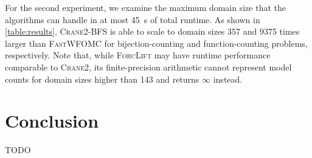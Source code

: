 \documentclass{article}
\theoremstyle{remark}
\newcommand{\Cranetwo}{\textsc{Crane2}}
\newcommand{\Cranebfs}{\textsc{Crane2-BFS}}
\begin{document}
For the second experiment, we examine the maximum domain size that the
algorithms can handle in at most \SI{45}{\second} of total runtime. As shown in
\cref{table:results}, \Cranebfs{} is able to scale to domain sizes \num{357} and
\num{9375} times larger than \textsc{FastWFOMC} for bijection-counting and
function-counting problems, respectively. Note that, while \textsc{ForcLift} may
have runtime performance comparable to \Cranetwo{}, its finite-precision
arithmetic cannot represent model counts for domain sizes higher than 143 and
returns $\infty$ instead.

\section{Conclusion}

TODO



\end{document}

